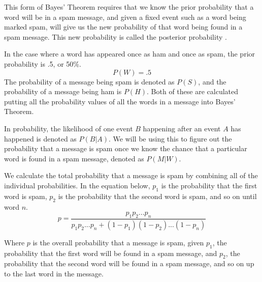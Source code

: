 \documentclass[12pt]{article}
\begin{document}
This form of Bayes' Theorem requires that we know the prior probability that a word will be in a spam
message, and given a fixed event such as a word being marked spam, will give us the new probability of that
word being found in a spam message. This new probability is called the posterior probability
\citep{bernardo1979reference}.

In the case where a word has appeared once as ham and once as spam, the prior probability is .5, or 50\%.
$$P(W) = .5$$
The probability of a message being spam is denoted as $P(S)$, and the probability of a message being ham is
$P(H)$. Both of these are calculated putting all the probability values of all the words in a message into
Bayes' Theorem.

In probability, the likelihood of one event $B$ happening after an event $A$ has happened is denoted as
$P(B|A)$. We will be using this to figure out the probability that a message is spam once we know the chance
that a particular word is found in a spam message, denoted as $P(M|W)$.

We calculate the total probability that a message is spam by combining all of the individual probabilities.
In the equation below, $p_{1}$ is the probability that the first word is spam, $p_{2}$ is the probability that
the second word is spam, and so on until word $n$.
$$p=\dfrac{p_{1}p_{2} ... p_{n}}{p_{1}p_{2} ... p_{n} + (1-p_{1})(1-p_{2}) ... (1-p_{n})}$$

Where $p$ is the overall probability that a message is spam, given $p_{1}$, the probability that the first
word will be found in a spam message, and $p_{2}$, the probability that the second word will be found in a
spam message, and so on up to the last word in the message.

\end{document}
